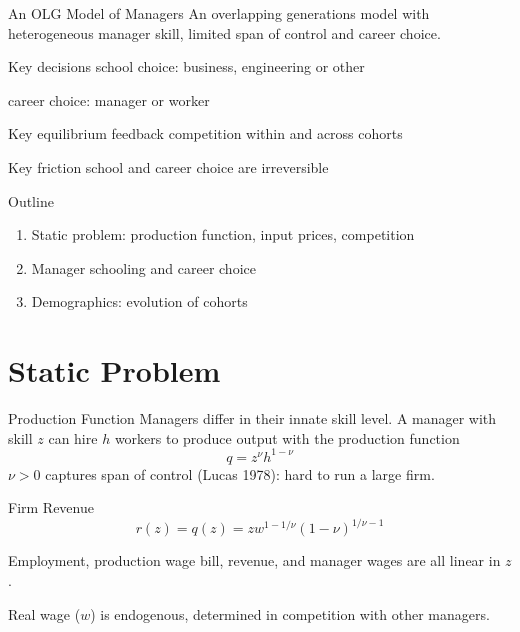 \documentclass[
  ignorenonframetext,
  aspectratio=1610,
]{beamer}
\providecommand{\tightlist}{%
  \setlength{\itemsep}{0pt}\setlength{\parskip}{0pt}}
\begin{document}
\begin{frame}{An OLG Model of Managers}
\protect\hypertarget{an-olg-model-of-managers-1}{}
An overlapping generations model with heterogeneous manager skill,
limited span of control and career choice.

\begin{block}{Key decisions}
\protect\hypertarget{key-decisions}{}
school choice: business, engineering or other

career choice: manager or worker
\end{block}

\begin{block}{Key equilibrium feedback}
\protect\hypertarget{key-equilibrium-feedback}{}
competition within and across cohorts
\end{block}

\begin{block}{Key friction}
\protect\hypertarget{key-friction}{}
school and career choice are irreversible
\end{block}
\end{frame}

\begin{frame}{Outline}
\protect\hypertarget{outline-1}{}
\begin{enumerate}
\tightlist
\item
  Static problem: production function, input prices, competition
\item
  Manager schooling and career choice
\item
  Demographics: evolution of cohorts
\end{enumerate}
\end{frame}

\section{Static Problem}\label{static-problem}

\begin{frame}{Production Function}
\protect\hypertarget{production-function}{}
Managers differ in their innate skill level. A manager with skill \(z\)
can hire \(h\) workers to produce output with the production function
\[q = z^\nu h^{1-\nu}\] \(\nu>0\) captures span of control (Lucas 1978):
hard to run a large firm.
\end{frame}

\begin{frame}{Firm Revenue}
\protect\hypertarget{firm-revenue}{}
\[r(z) = q(z) = z w^{1-1/\nu}(1-\nu)^{1/\nu-1}\]

Employment, production wage bill, revenue, and manager wages are all
linear in \(z\).

Real wage (\(w\)) is endogenous, determined in competition with other
managers.
\end{frame}
\end{document}
